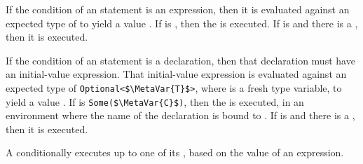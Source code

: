 If the condition of an  statement is an expression, then it is evaluated against an expected type of  to yield a value .
If  is , then the  is executed.
If  is  and there is a , then it is executed.

If the condition of an  statement is a  declaration, then that declaration must have an initial-value expression.
That initial-value expression is evaluated against an expected type of \lstinline[style=SlangCodeStyle]|Optional<$\MetaVar{T}$>|, where  is a fresh type variable, to yield a value .
If  is \lstinline[style=SlangCodeStyle]|Some($\MetaVar{C}$)|, then the  is executed, in an environment where the name of the  declaration is bound to .
If  is  and there is a , then it is executed.


\begin{Description}
	A  conditionally executes up to one of its , based on the value of an expression.
\end{Description}
	
\begin{Syntax}
	 \\
		 \code{(}  \code{)}
		\lcurly\ \SynPlus \rcurly\ \\

	 \\
		\SynPlus {}\SynPlus

		\SynOr {} \\
	
		  \code{:} \\
	
		 \code{;} \\
\end{Syntax}

\begin{Checking}
\end{Checking}

